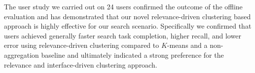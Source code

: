 The user study we carried out on 24 users confirmed the outcome of the offline evaluation and has demonstrated that our novel relevance-driven clustering based approach is highly effective for our search scenario.  Specifically we confirmed that users achieved generally faster search task completion, higher recall, and lower error using relevance-driven clustering compared to $K$-means and a non-aggregation baseline and ultimately indicated a strong preference for the relevance and interface-driven clustering approach.




